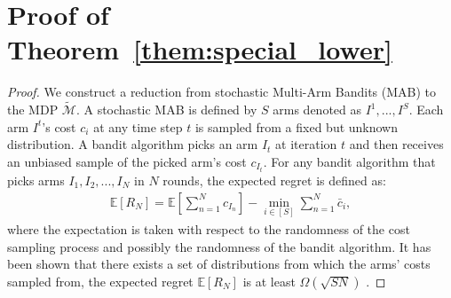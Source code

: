 \documentclass{article}
\begin{document}
\section{Proof of Theorem~\ref{them:special_lower}}
\label{sec:special_lower}
\begin{proof}
We construct a reduction from stochastic Multi-Arm Bandits (MAB) to the MDP $\tilde{\mathcal{M}}$. A stochastic MAB is defined by $S$ arms denoted as $I^1, ..., I^S$. Each arm $I^t$'s cost $c_{i}$ at any time step $t$ is sampled from a fixed but unknown distribution. A bandit algorithm picks an arm $I_t$ at  iteration $t$ and then receives an unbiased sample of the picked arm's cost $c_{I_t}$. For any bandit algorithm that picks arms $I_1, I_2,...,I_N$ in $N$ rounds, the expected regret is defined as:
\begin{align}
\mathbb{E}[R_N] = \mathbb{E}[  \sum_{n=1}^N c_{I_n}] - \min_{i\in[S]}\sum_{n=1}^N \bar{c}_{i},
\end{align} where the expectation is taken with respect to the randomness of the cost sampling process and possibly the randomness of the bandit algorithm. It has been shown that there exists a set of distributions  from which the arms' costs sampled from, the expected regret $\mathbb{E}[R_N]$ is at least $\Omega(\sqrt{S N})$ \cite{bubeck2012regret}. 


\end{proof}
\end{document}
